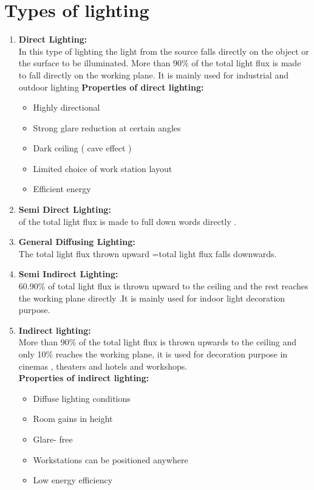 \documentclass[12pt,fleqn]{book} %
\begin{document}
 \section{Types of lighting}
 \begin{enumerate}
 \item \textbf {Direct Lighting:}
 \\ In this type of lighting the light from the source falls directly on the object or the surface to be illuminated. More than 90\% of the total light flux is made to fall directly on the working plane. It is mainly used for industrial and outdoor lighting
\textbf {Properties of direct lighting:}
\begin {itemize}
\item  {Highly directional}
\item  {Strong glare reduction at certain angles}
\item  {Dark ceiling ( cave effect )}
\item  {Limited choice of work station layout}
\item  {Efficient energy}
\end {itemize}
 \item \textbf {Semi Direct Lighting: }
\\ [ 60.90\% ] of the total light flux is made to full down words directly .
 \item \textbf {General Diffusing Lighting:}
 \\ The total light flux thrown upward =total light flux falls downwards.
 \item \textbf {Semi Indirect Lighting:}
 \\ 60.90\% of total light flux is thrown upward to the ceiling and the rest reaches the working plane directly .It is mainly used for indoor light decoration purpose.
 \item \textbf {Indirect lighting:}
 \\ More than 90\% of the total light flux is thrown upwards to the ceiling and only 10\% reaches the working plane, it is used for decoration purpose in cinemas , theaters and hotels and workshops.   \\
\textbf {Properties of indirect lighting:}
\begin {itemize}
\item  {Diffuse lighting conditions}
\item  {Room gains in height}
\item  {Glare- free}
\item  {Workstations can be positioned anywhere}
\item  {Low energy efficiency}
\end {itemize}
 \end{enumerate}
\end{document}
